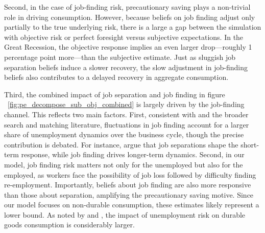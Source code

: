 Second, in the case of job-finding risk, precautionary saving plays a non-trivial role in driving consumption. However, because beliefs on job finding adjust only partially to the true underlying risk, there is a large a gap between the simulation with objective risk or perfect foresight versus subjective expectations. In the Great Recession, the objective response implies an even larger drop---roughly 1 percentage point more---than the subjective estimate. Just as sluggish job separation beliefs induce a slower recovery, the slow adjustment in job-finding beliefs also contributes to a delayed recovery in aggregate consumption.

Third, the combined impact of job separation and job finding in figure ~\ref{fig:pe_decompose_sub_obj_combined}  is largely driven by the job-finding channel. This reflects two main factors. First, consistent with \cite{fujita2009cyclicality} and the broader search and matching literature, fluctuations in job finding account for a larger share of unemployment dynamics over the business cycle, though the precise contribution is debated. For instance, \cite{broer2021unemployment} argue that job separations shape the short-term response, while job finding drives longer-term dynamics. Second, in our model, job finding risk matters not only for the unemployed but also for the employed, as workers face the possibility of job loss followed by difficulty finding re-employment.  Importantly, beliefs about job finding are also more responsive than those about separation, amplifying the precautionary saving motive. Since our model focuses on non-durable consumption, these estimates likely represent a lower bound. As noted by \cite{carroll1997unemployment} and \cite{harmenberg2021consumption}, the impact of unemployment risk on durable goods consumption is considerably larger.

